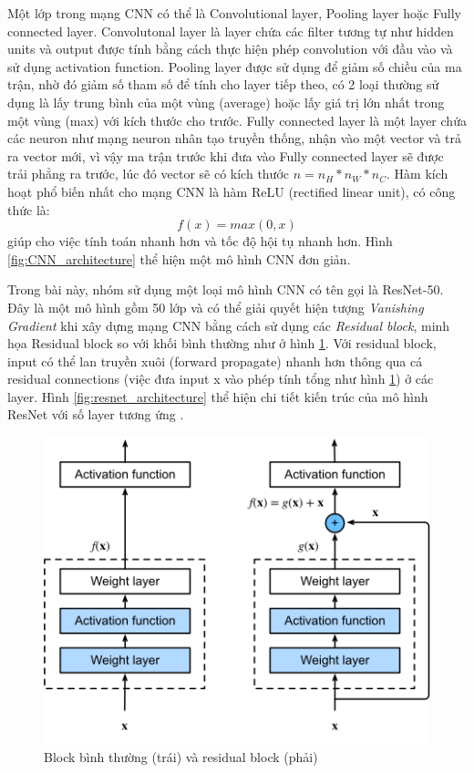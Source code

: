 \documentclass[conference]{IEEEtran}
\begin{document}
Một lớp trong mạng CNN có thể là Convolutional layer, Pooling layer hoặc Fully connected layer. Convolutonal layer là layer chứa các filter tương tự như hidden units và output được tính bằng cách thực hiện phép convolution với đầu vào và sử dụng activation function. Pooling layer được sử dụng để giảm số chiều của ma trận, nhờ đó giảm số tham số để tính cho layer tiếp theo, có 2 loại thường sử dụng là lấy trung bình của một vùng (average) hoặc lấy giá trị lớn nhất trong một vùng (max) với kích thước cho trước. Fully connected layer là một layer chứa các neuron như mạng neuron nhân tạo truyền thống, nhận vào một vector và trả ra vector mới, vì vậy ma trận trước khi đưa vào Fully connected layer sẽ được trải phẳng ra trước, lúc đó vector sẽ có kích thước $n=n_{H}*n_{W}*n_{C}$. Hàm kích hoạt phổ biến nhất cho mạng CNN là hàm ReLU (rectified linear unit), có công thức là:
$$f(x)=max(0,x)$$
giúp cho việc tính toán nhanh hơn và tốc độ hội tụ nhanh hơn. Hình \ref{fig:CNN_architecture} thể hiện một mô hình CNN đơn giản.

Trong bài này, nhóm sử dụng một loại mô hình CNN có tên gọi là ResNet-50\cite{he2015deep}. Đây là một mô hình gồm 50 lớp và có thể giải quyết hiện tượng \textit{Vanishing Gradient} khi xây dựng mạng CNN bằng cách sử dụng các \textit{Residual block}, minh họa Residual block so với khối bình thường như ở hình \ref{fig:residual_block}. Với residual block, input có thể lan truyền xuôi (forward propagate) nhanh hơn thông qua cá residual connections (việc đưa input x vào phép tính tổng như hình \ref{fig:residual_block}) ở các layer. Hình \ref{fig:resnet_architecture} thể hiện chi tiết kiến trúc của mô hình ResNet với số layer tương ứng \cite{he2015deep}.

\begin{figure}[h]
\includegraphics[width=0.9\columnwidth]{assets/residual-block.png}
  \caption{Block bình thường (trái) và residual block (phải) }
  \label{fig:residual_block}
\end{figure}
\end{document}
